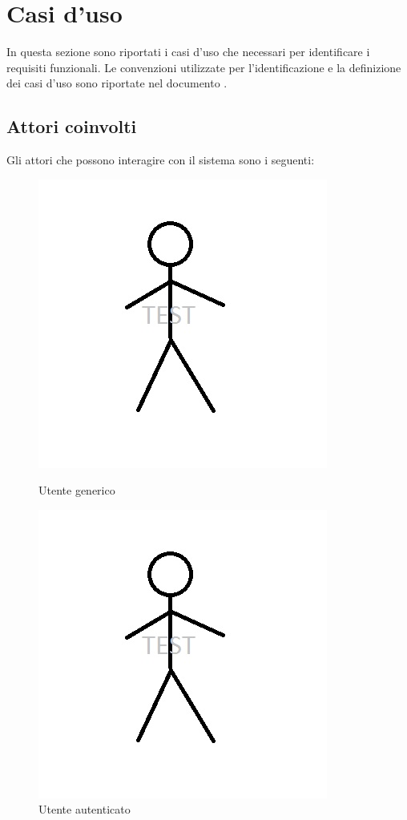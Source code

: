 \section{Casi d'uso}
In questa sezione sono riportati i casi d'uso che necessari per identificare i requisiti funzionali.
Le convenzioni utilizzate per l'identificazione e la definizione dei casi d'uso sono riportate nel documento \NormeDiProgetto{}.

\subsection{Attori coinvolti}
Gli attori che possono interagire con il sistema sono i seguenti:\\

\begin{figure}[H]
\centering
\begin{minipage}[b]{0.45\textwidth}
\centering
\includegraphics[width=%
0.56\textwidth{}]{./grafici/example}
\caption{Utente generico}
\end{minipage}
\begin{minipage}[b]{0.45\textwidth}
\centering
\includegraphics[width=%
0.56\textwidth{}]{./grafici/example}
\caption{Utente autenticato}
\end{minipage}
\end{figure}

